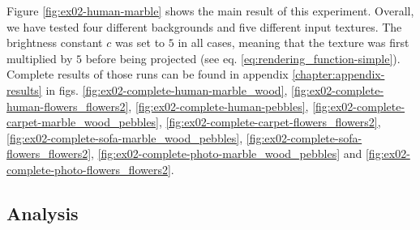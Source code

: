 Figure \ref{fig:ex02-human-marble} shows the main result of this experiment. Overall, we have tested four different backgrounds and five different input textures. The brightness constant \(c\) was set to \(5\) in all cases, meaning that the texture was first multiplied by \(5\) before being projected (see eq. \ref{eq:rendering_function-simple}). Complete results of those runs can be found in appendix \ref{chapter:appendix-results} in figs. \ref{fig:ex02-complete-human-marble_wood}, \ref{fig:ex02-complete-human-flowers_flowers2}, \ref{fig:ex02-complete-human-pebbles}, \ref{fig:ex02-complete-carpet-marble_wood_pebbles}, \ref{fig:ex02-complete-carpet-flowers_flowers2}, \ref{fig:ex02-complete-sofa-marble_wood_pebbles}, \ref{fig:ex02-complete-sofa-flowers_flowers2}, \ref{fig:ex02-complete-photo-marble_wood_pebbles} and \ref{fig:ex02-complete-photo-flowers_flowers2}.

\subsection{Analysis}
\label{section:results-experiments-02-analysis}

